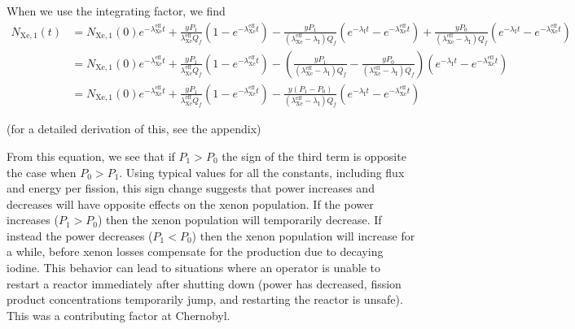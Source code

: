 \documentclass{report}
\begin{document}
When we use the integrating factor, we find
\begin{align*}
N_{\text{Xe},1}(t)	&= N_{\text{Xe},1}(0)e^{-\lambda_{\text{Xe}}^{\text{eff}}t} + \frac{yP_1}{\lambda_{\text{Xe}}^{\text{eff}}Q_f}\left(1-e^{-\lambda_{\text{Xe}}^{\text{eff}} t}\right) - \frac{yP_1}{(\lambda_{\text{Xe}}^{\text{eff}}-\lambda_{\text{I}}) Q_f} \left(e^{-\lambda_{\text{I}}t} - e^{-\lambda_{\text{Xe}}^{\text{eff}}t}\right) + \frac{yP_0}{(\lambda_{\text{Xe}}^{\text{eff}}-\lambda_{\text{I}}) Q_f} \left(e^{-\lambda_{\text{I}}t} - e^{-\lambda_{\text{Xe}}^{\text{eff}}t}\right) \\
					&= N_{\text{Xe},1}(0)e^{-\lambda_{\text{Xe}}^{\text{eff}}t} + \frac{yP_1}{\lambda_{\text{Xe}}^{\text{eff}}Q_f}\left(1-e^{-\lambda_{\text{Xe}}^{\text{eff}} t}\right) - \left(\frac{yP_1}{(\lambda_{\text{Xe}}^{\text{eff}}-\lambda_{\text{I}}) Q_f} - \frac{yP_0}{(\lambda_{\text{Xe}}^{\text{eff}}-\lambda_{\text{I}}) Q_f}\right) \left(e^{-\lambda_{\text{I}}t} - e^{-\lambda_{\text{Xe}}^{\text{eff}}t}\right) \\
					&= N_{\text{Xe},1}(0)e^{-\lambda_{\text{Xe}}^{\text{eff}}t} + \frac{yP_1}{\lambda_{\text{Xe}}^{\text{eff}}Q_f}\left(1-e^{-\lambda_{\text{Xe}}^{\text{eff}} t}\right) - \frac{y\left(P_1-P_0\right)}{(\lambda_{\text{Xe}}^{\text{eff}}-\lambda_{\text{I}}) Q_f} \left(e^{-\lambda_{\text{I}}t} - e^{-\lambda_{\text{Xe}}^{\text{eff}}t}\right)
\end{align*}
\begin{center}(for a detailed derivation of this, see the appendix)\end{center}

From this equation, we see that if $P_1 > P_0$ the sign of the third term is opposite the case when $P_0 > P_1$. Using typical values for all the constants, including flux and energy per fission, this sign change suggests that power increases and decreases will have opposite effects on the xenon population. If the power increases ($P_1 > P_0$) then the xenon population will temporarily decrease. If instead the power decreases ($P_1 < P_0$) then the xenon population will increase for a while, before xenon losses compensate for the production due to decaying iodine. This behavior can lead to situations where an operator is unable to restart a reactor immediately after shutting down (power has decreased, fission product concentrations temporarily jump, and restarting the reactor is unsafe). This was a contributing factor at Chernobyl.
\end{document}
